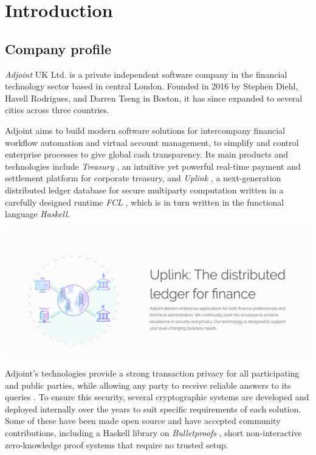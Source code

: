 \documentclass[11pt]{article}
\begin{document}
\pagebreak

\section{Introduction}

\subsection{Company profile}

\emph{Adjoint} UK Ltd. \cite{adjoint} is a private independent software company in the financial technology sector based in central London. Founded in 2016 by Stephen Diehl, Havell Rodrigues, and Darren Tseng in Boston, it has since expanded to several cities across three countries.

Adjoint aims to build modern software solutions for intercompany financial workflow automation and virtual account management, to simplify and control enterprise processes to give global cash transparency. Its main products and technologies include \emph{Treasury} \cite{treasury}, an intuitive yet powerful real-time payment and settlement platform for corporate treasury, and \emph{Uplink} \cite{uplink}, a next-generation distributed ledger database for secure multiparty computation written in a carefully designed runtime \emph{FCL} \cite{fcl}, which is in turn written in the functional language \emph{Haskell}.

\begin{center}
\includegraphics[width=\textwidth]{uplink.png}
\end{center}

Adjoint's technologies provide a strong transaction privacy for all participating and public parties, while allowing any party to receive reliable answers to its queries \cite{cryptography}. To ensure this security, several cryptographic systems are developed and deployed internally over the years to suit specific requirements of each solution. Some of these have been made open source and have accepted community contributions, including a Haskell library on \emph{Bulletproofs} \cite{bulletproofs}, short non-interactive zero-knowledge proof systems that require no trusted setup.
\end{document}
